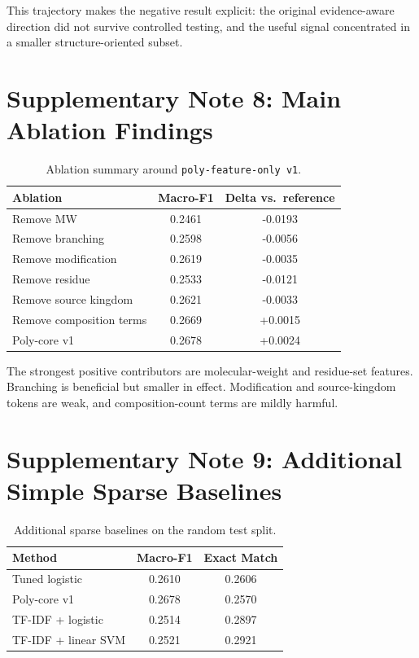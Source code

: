 \documentclass{article}
\begin{document}
This trajectory makes the negative result explicit: the original evidence-aware direction did not survive controlled testing, and the useful signal concentrated in a smaller structure-oriented subset.

\section{Supplementary Note 8: Main Ablation Findings}

\begin{table}[h]
\centering
\caption{Ablation summary around \texttt{poly-feature-only v1}.}
\begin{tabular}{lcc}
\toprule
Ablation & Macro-F1 & Delta vs.\ reference \\
\midrule
Remove MW & 0.2461 & -0.0193 \\
Remove branching & 0.2598 & -0.0056 \\
Remove modification & 0.2619 & -0.0035 \\
Remove residue & 0.2533 & -0.0121 \\
Remove source kingdom & 0.2621 & -0.0033 \\
Remove composition terms & 0.2669 & +0.0015 \\
Poly-core v1 & 0.2678 & +0.0024 \\
\bottomrule
\end{tabular}
\end{table}

The strongest positive contributors are molecular-weight and residue-set features. Branching is beneficial but smaller in effect. Modification and source-kingdom tokens are weak, and composition-count terms are mildly harmful.

\section{Supplementary Note 9: Additional Simple Sparse Baselines}

\begin{table}[h]
\centering
\caption{Additional sparse baselines on the random test split.}
\begin{tabular}{lcc}
\toprule
Method & Macro-F1 & Exact Match \\
\midrule
Tuned logistic & 0.2610 & 0.2606 \\
Poly-core v1 & 0.2678 & 0.2570 \\
TF-IDF + logistic & 0.2514 & 0.2897 \\
TF-IDF + linear SVM & 0.2521 & 0.2921 \\
\bottomrule
\end{tabular}
\end{table}
\end{document}

